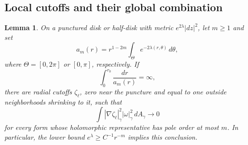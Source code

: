 \documentclass[11pt]{amsart}
\numberwithin{equation}{section}
\newtheorem{lemma}[theorem]{Lemma}
\theoremstyle{definition}
\theoremstyle{remark}
\begin{document}
\subsection{Local cutoffs and their global combination}
\begin{lemma}\label{lem:radial-capacity}
On a punctured disk or half-disk with metric $e^{2\lambda}|dz|^2$, let $m\ge1$ and set
\[
a_m(r)=r^{1-2m}\int_{\Theta}e^{-2\lambda(r,\theta)}\,d\theta,
\]
where $\Theta=[0,2\pi]$ or $[0,\pi]$, respectively. If
\begin{equation}\label{eq:capacity-condition}
\int_0^{r_0}\frac{dr}{a_m(r)}=\infty,
\end{equation}
there are radial cutoffs $\zeta_\ell$, zero near the puncture and equal to one outside neighborhoods shrinking to it, such that
\[
\int |\nabla\zeta_\ell|_\gamma^2|\omega|_\gamma^2\,dA_\gamma\longrightarrow0
\]
for every form whose holomorphic representative has pole order at most $m$. In particular, the lower bound $e^\lambda\ge C^{-1}r^{-m}$ implies this conclusion.
\end{lemma}
\end{document}
